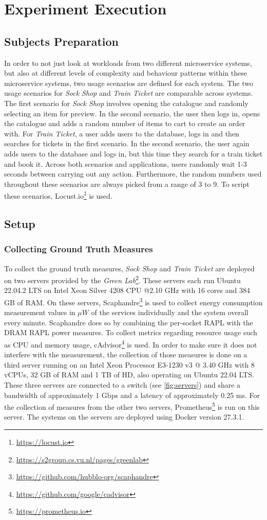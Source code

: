 \section{Experiment Execution}
\subsection{Subjects Preparation}
In order to not just look at workloads from two different microservice systems, but also at different levels of complexity and behaviour patterns within these microservice systems, two usage scenarios are defined for each system.
The two usage scenarios for \textit{Sock Shop} and \textit{Train Ticket} are comparable across systems. The first scenario for \textit{Sock Shop} involves opening the catalogue and randomly selecting an item for preview. In the second scenario, the user then logs in, opens the catalogue and adds a random number of items to cart to create an order with. For \textit{Train Ticket}, a user adds users to the database, logs in and then searches for tickets in the first scenario. In the second scenario, the user again adds users to the database and logs in, but this time they search for a train ticket and book it. Across both scenarios and applications, users randomly wait 1-3 seconds between carrying out any action. Furthermore, the random numbers used throughout these scenarios are always picked from a range of 3 to 9. To script these scenarios, Locust.io\footnote{\url{https://locust.io}} is used.

\subsection{Setup}
\subsubsection{Collecting Ground Truth Measures}
To collect the ground truth measures, \textit{Sock Shop} and \textit{Train Ticket} are deployed on two servers provided by the \textit{Green Lab}\footnote{\url{https://s2group.cs.vu.nl/pages/greenlab}}. These servers each run Ubuntu 22.04.2 LTS on Intel Xeon Silver 4208 CPU @2.10 GHz with 16 cores and 384 GB of RAM. 
On these servers, Scaphandre\footnote{\url{https://github.com/hubblo-org/scaphandre}} is used to collect energy consumption measurement values in $\mu W$ of the services individually and the system overall every minute. Scaphandre does so by combining the per-socket RAPL with the DRAM RAPL power measures. To collect metrics regarding resource usage such as CPU and memory usage, cAdvisor\footnote{\url{https://github.com/google/cadvisor}} is used.
In order to make sure it does not interfere with the measurement, the collection of those measures is done on a third server running on an Intel Xeon Processor E3-1230 v3 @ 3.40 GHz with 8 vCPUs, 32 GB of RAM and 1 TB of HD, also operating on Ubuntu 22.04 LTS. These three servers are connected to a switch (see \autoref{fig:servers}) and share a bandwidth of approximately 1 Gbps and a latency of approximately 0.25 ms. For the collection of measures from the other two servers, Prometheus\footnote{\url{https://prometheus.io}} is run on this server. The systems on the servers are deployed using Docker version 27.3.1.

